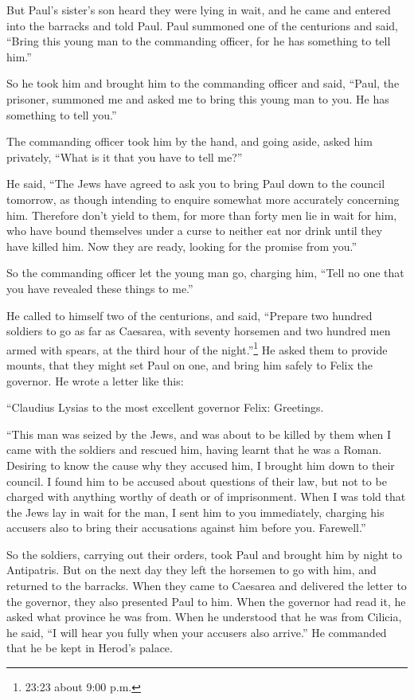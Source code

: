  But Paul's sister's son heard they were lying in wait, and
he came and entered into the barracks and told Paul.  Paul
summoned one of the centurions and said, ``Bring this young man to the
commanding officer, for he has something to tell him.''

 So he took him and brought him to the commanding officer
and said, ``Paul, the prisoner, summoned me and asked me to bring this
young man to you. He has something to tell you.''

 The commanding officer took him by the hand, and going
aside, asked him privately, ``What is it that you have to tell me?''

 He said, ``The Jews have agreed to ask you to bring Paul
down to the council tomorrow, as though intending to enquire somewhat
more accurately concerning him.  Therefore don't yield to
them, for more than forty men lie in wait for him, who have bound
themselves under a curse to neither eat nor drink until they have killed
him. Now they are ready, looking for the promise from you.''

 So the commanding officer let the young man go, charging
him, ``Tell no one that you have revealed these things to me.''

 He called to himself two of the centurions, and said,
``Prepare two hundred soldiers to go as far as Caesarea, with seventy
horsemen and two hundred men armed with spears, at the third hour of the
night.''\footnote{23:23 about 9:00 p.m.}  He asked them to
provide mounts, that they might set Paul on one, and bring him safely to
Felix the governor.  He wrote a letter like this:

 ``Claudius Lysias to the most excellent governor Felix:
Greetings.

 ``This man was seized by the Jews, and was about to be
killed by them when I came with the soldiers and rescued him, having
learnt that he was a Roman.  Desiring to know the cause why
they accused him, I brought him down to their council.  I
found him to be accused about questions of their law, but not to be
charged with anything worthy of death or of imprisonment. 
When I was told that the Jews lay in wait for the man, I sent him to you
immediately, charging his accusers also to bring their accusations
against him before you. Farewell.''

 So the soldiers, carrying out their orders, took Paul and
brought him by night to Antipatris.  But on the next day
they left the horsemen to go with him, and returned to the barracks.
 When they came to Caesarea and delivered the letter to the
governor, they also presented Paul to him.  When the
governor had read it, he asked what province he was from. When he
understood that he was from Cilicia, he said,  ``I will
hear you fully when your accusers also arrive.'' He commanded that he be
kept in Herod's palace.

